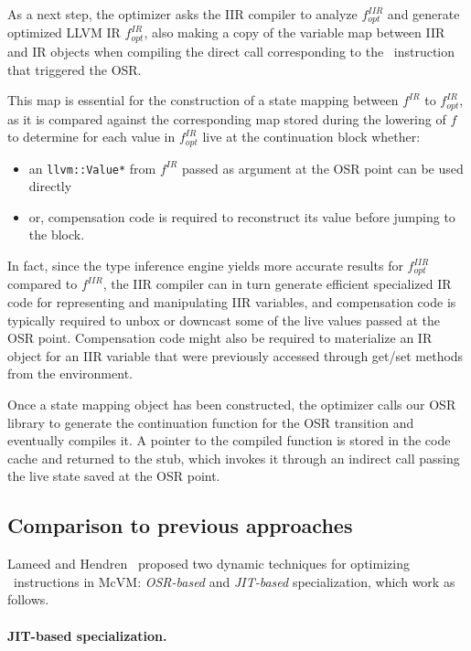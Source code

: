 As a next step, the optimizer asks the IIR compiler to analyze $f^{IIR}_{opt}$ and generate optimized LLVM IR $f^{IR}_{opt}$, also making a copy of the variable map between IIR and IR objects when compiling the direct call corresponding to the \feval\ instruction that triggered the OSR.

This map is essential for the construction of a state mapping between $f^{IR}$ to $f^{IR}_{opt}$, as it is compared against the corresponding map stored during the lowering of $f$ to determine for each value in $f^{IR}_{opt}$ live at the continuation block whether:
\begin{itemize}
\item an {\tt llvm::Value*} from $f^{IR}$ passed as argument at the OSR point can be used directly
\item or, compensation code is required to reconstruct its value before jumping to the block.
\end{itemize}

\noindent In fact, since the type inference engine yields more accurate results for $f^{IIR}_{opt}$ compared to $f^{IIR}$, the IIR compiler can in turn generate efficient specialized IR code for representing and manipulating IIR variables, and compensation code is typically required to unbox or downcast some of the live values passed at the OSR point. Compensation code might also be required to materialize an IR object for an IIR variable that were previously accessed through get/set methods from the environment.

Once a state mapping object has been constructed, the optimizer calls our OSR library to generate the continuation function for the OSR transition and eventually compiles it. A pointer to the compiled function is stored in the code cache and returned to the stub, which invokes it through an indirect call passing the live state saved at the OSR point.

\subsection{Comparison to previous approaches}

Lameed and Hendren~\cite{lameed2013feval} proposed two dynamic techniques for optimizing \feval\ instructions in McVM: {\em OSR-based} and {\em JIT-based} specialization, which work as follows.

\paragraph{JIT-based specialization.}  

